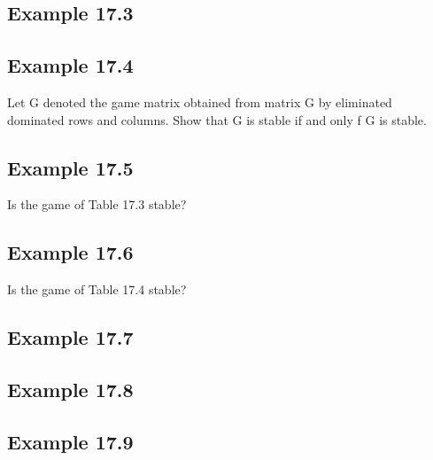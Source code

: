 \documentclass[]{report}
\begin{document}


\subsection{Example 17.3}


\subsection{Example 17.4}

Let G denoted the game matrix obtained from matrix G by eliminated dominated rows and columns. Show that G is stable if and only f G
is stable.






\subsection{Example 17.5}
Is the game of Table 17.3 stable?



\subsection{Example 17.6}
Is the game of Table 17.4 stable?

\subsection{Example 17.7}


\subsection{Example 17.8}




\subsection{Example 17.9}





\end{document}
